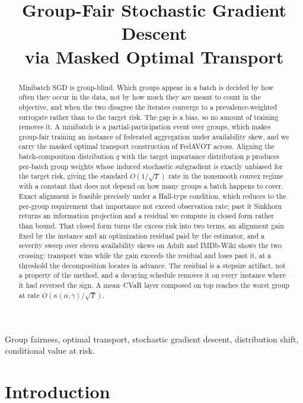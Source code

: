 \documentclass{article}
\title{Group-Fair Stochastic Gradient Descent \\ via Masked Optimal Transport}
\theoremstyle{definition}
\begin{document}
\ninept
\maketitle

\begin{abstract}
Minibatch SGD is group-blind. Which groups appear in a batch is decided by how
often they occur in the data, not by how much they are meant to count in the
objective, and when the two disagree the iterates converge to a
prevalence-weighted surrogate rather than to the target risk. The gap is a bias,
so no amount of training removes it. A minibatch is a partial-participation
event over groups, which makes group-fair training an instance of federated
aggregation under availability skew, and we carry the masked optimal transport
construction of \textsf{FedAVOT} across. Aligning the
batch-composition distribution $q$ with the target importance distribution $p$
produces per-batch group weights whose induced stochastic subgradient is exactly
unbiased for the target risk, giving the standard $O(1/\sqrt{T})$ rate in the
nonsmooth convex regime with a constant that does not depend on how many groups
a batch happens to cover. Exact alignment is feasible precisely under a Hall-type condition, which reduces
to the per-group requirement that importance not exceed observation rate; past
it Sinkhorn returns an information projection and a residual we compute in
closed form rather than bound. That closed form turns the excess risk into two
terms, an alignment gain fixed by the instance and an optimization residual paid
by the estimator, and a severity sweep over eleven availability skews on Adult
and IMDb-Wiki shows the two crossing: transport wins while the gain exceeds the
residual and loses past it, at a threshold the decomposition locates in advance.
The residual is a stepsize artifact, not a property of the method, and a
decaying schedule removes it on every instance where it had reversed the sign.
A mean--CVaR layer composed on top reaches the worst group at rate
$O(\kappa(\alpha,\gamma)/\sqrt{T})$.
\end{abstract}

\begin{keywords}
Group fairness, optimal transport, stochastic gradient descent,
distribution shift, conditional value at risk.
\end{keywords}

\section{Introduction}
\end{document}
